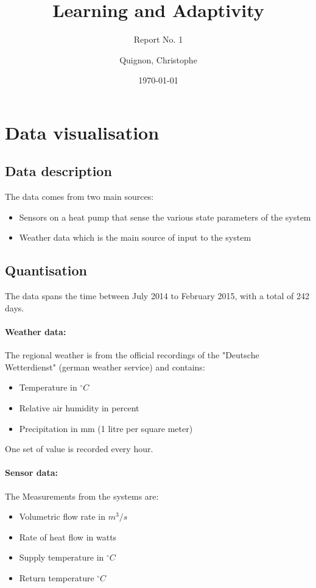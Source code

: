 \documentclass{scrartcl}
\begin{document}
\title{Learning and Adaptivity}
\subtitle{Report No. 1}
\author{
  Quignon, Christophe
}
\date{\today}


\maketitle

\section{Data visualisation}
\subsection{Data description}
The data comes from two main sources:
\begin{itemize}
\item Sensors on a heat pump that sense the various state parameters of the system
\item Weather data which is the main source of input to the system
\end{itemize}


\subsection{Quantisation}
The data spans the time between July 2014 to February 2015, with a total of 242 days.

\paragraph{Weather data:}
The regional weather is from the official recordings of the "Deutsche Wetterdienst" (german weather service) and contains:

\begin{itemize}
\item Temperature in $^\circ C$
\item Relative air humidity in percent
\item Precipitation in mm (1 litre per square meter)
\end{itemize}

One set of value is recorded every hour.

\paragraph{Sensor data:}
The Measurements from the systems are:

\begin{itemize}
\item Volumetric flow rate in $m^3 / s$
\item Rate of heat flow in watts
\item Supply temperature in $^\circ C$
\item Return temperature $^\circ C$
\end{itemize}
\end{document}
